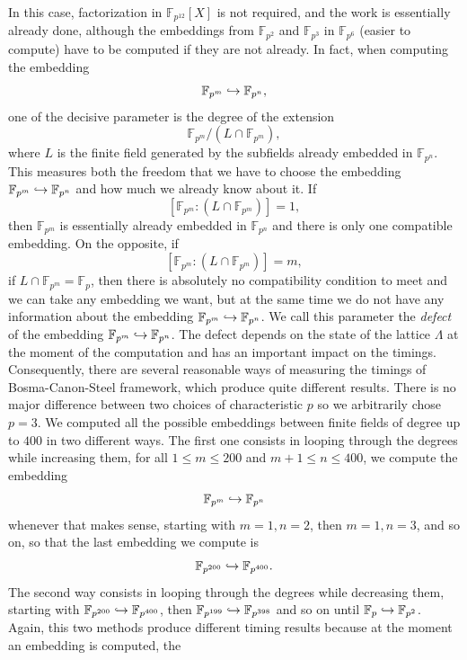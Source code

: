 In this case, factorization in $\mathbb{F}_{p^{12}}[X]$ is not required, and the
work is essentially already done, although the embeddings from
$\mathbb{F}_{p^{2}}$ and $\mathbb{F}_{p^{3}}$ in $\mathbb{F}_{p^{6}}$ (easier
to compute) have to be computed if they are not already.
In fact, when computing the embedding
\[
  \mathbb{F}_{p^{m}}\hookrightarrow\mathbb{F}_{p^{n}},
\]
one of the decisive parameter is the degree of the extension 
\[
  \mathbb{F}_{p^{m}}/(L\cap\mathbb{F}_{p^{m}}),
\]
where $L$ is the finite field generated by the subfields already embedded in
$\mathbb{F}_{p^{n}}$. This measures both the freedom that we have to choose the
embedding $\mathbb{F}_{p^{m}}\hookrightarrow\mathbb{F}_{p^{n}}$ and how much we already
know about it. If
\[
  \left[ \mathbb{F}_{p^{m}}:(L\cap\mathbb{F}_{p^{m}})\right]=1,
\]
then $\mathbb{F}_{p^{m}}$ is essentially already embedded in
$\mathbb{F}_{p^{n}}$ and there is only one compatible embedding. On the
opposite, if 
\[
  \left[ \mathbb{F}_{p^{m}}:(L\cap\mathbb{F}_{p^{m}})\right]=m,
\]
\ie if $L\cap\mathbb{F}_{p^{m}}=\mathbb{F}_p$, then there is absolutely no
compatibility condition to meet and we can take any embedding we want, but at
the same time we do not have any information about the embedding
$\mathbb{F}_{p^{m}}\hookrightarrow\mathbb{F}_{p^{n}}$. We call this parameter the
\emph{defect} of the embedding $\mathbb{F}_{p^{m}}\hookrightarrow\mathbb{F}_{p^{n}}$.
The defect depends on the state of the lattice $\Lambda$ at the moment of the
computation and has an important impact on the timings.
Consequently, there are several reasonable ways of measuring the timings
of Bosma-Canon-Steel framework, which produce quite different results.
There is no major difference between two choices of characteristic $p$ so we
arbitrarily chose $p=3$. We
computed all the possible embeddings between finite fields of degree up to $400$
in two different ways. The first one consists in looping through the degrees
while increasing them, \ie for all $1\leq m\leq200$ and $m+1 \leq n\leq 400$, we
compute the embedding 
\[
  \mathbb{F}_{p^{m}}\hookrightarrow \mathbb{F}_{p^{n}}
\]
whenever that makes sense, starting with $m=1, n=2$, then $m=1, n=3$, and so on, so
that the last embedding we compute is 
\[
  \mathbb{F}_{p^{200}}\hookrightarrow\mathbb{F}_{p^{400}}.
\]
The second way consists in looping through the
degrees while decreasing them, \ie starting with
$\mathbb{F}_{p^{200}}\hookrightarrow\mathbb{F}_{p^{400}}$, then
$\mathbb{F}_{p^{199}}\hookrightarrow\mathbb{F}_{p^{398}}$ and so on until
$\mathbb{F}_{p}\hookrightarrow\mathbb{F}_{p^{2}}$. Again, this two methods produce
different timing results because at the moment an embedding is computed, the
